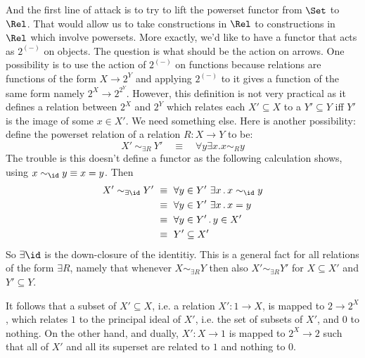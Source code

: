 

And the first line of attack is to try
to lift the powerset functor from $\Set$ to $\Rel$. That would allow
us to take constructions in $\Rel$ to constructions in $\Rel$ which
involve powersets. More exactly, we'd like to have a functor that acts
as $2^(-)$ on objects. The question is what should be the action on
arrows.  One possibility is to use the action of $2^{(-)}$ on
functions because relations are functions of the form $X \to 2^Y$ and
applying $2^{(-)}$ to it gives a function of the same form namely $2^X
\to 2^{2^Y}$. However, this definition is not very practical as it
defines a relation between $2^X$ and $2^Y$ which relates each $X'
\subseteq X$ to a $Y' \subseteq Y$ iff $Y'$ is the image of some $x
\in X'$. We need something else.  Here is another possibility:
define the powerset relation of a relation $R : X \to Y$ to be:
%
\begin{equation}\label{eq:power}
X' ~ \sim_{\exists R} ~ Y' \quad \equiv \quad \forall y \exists x . x \sim_R y
\end{equation}
% 
The trouble is this doesn't define a functor as the following
calculation shows, using $x \sim_\id y
\equiv x = y$. Then 
\begin{align*}
    X' \sim_{\exists \id} Y' & ~ \equiv ~ \forall y \in Y' ~ \exists x \,.\, x \sim_\id y\\
&~\equiv~ \forall y \in Y' ~ \exists x\,.\, x = y \\
&~\equiv~\forall y \in Y' \,.\, y \in X'\\
& ~\equiv ~ Y' \subseteq X'
  \end{align*}
%
So $\exists \id$ is the down-closure of the identitiy. This is a general
fact for all relations of the form $\exists R$, namely that whenever $X
\sim_{\exists R} Y$ then also $X' \sim_{\exists R} Y'$ for $X \subseteq X'$ and
$Y' \subseteq Y$. 

\begin{remark}
It follows that a subset of $X' \subseteq X$, i.e. a relation $X' : 1 \to X$, is
mapped to $2 \to 2^X$, which relates $1$ to the principal ideal of
$X'$, i.e. the set of subsets of $X'$, and $0$ to nothing. On the
other hand, and dually, $X' : X \to 1$ is mapped to $2^X \to 2$ such
that all of $X'$ and all its superset are related to $1$ and nothing
to $0$. 
\end{remark}

